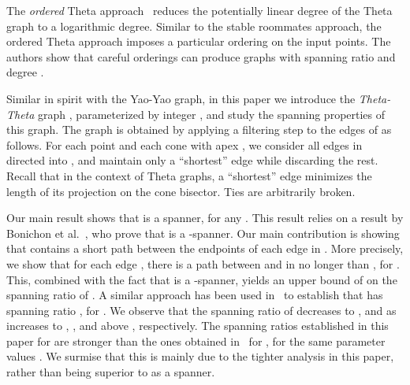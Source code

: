 \documentclass[runningheads,a4paper]{llncs}
\begin{document}
The \emph{ordered} Theta approach~\cite{BoseGM04} reduces the potentially linear degree of the Theta graph to a logarithmic degree.  
Similar to the stable roommates approach, the ordered Theta approach imposes a particular ordering on the input points. 
The authors show that careful orderings can produce graphs with spanning ratio  and degree . 




Similar in spirit with the Yao-Yao graph, in this paper we introduce the \emph{Theta-Theta} graph , parameterized by integer , and study the spanning properties of this graph.  The graph  is obtained by applying a filtering step to the edges of  as follows. For each point  and each cone  with apex , we consider all edges in  directed into , and maintain only a ``shortest'' edge while discarding the rest. Recall that in the context of Theta graphs, a ``shortest'' edge minimizes the length of its projection on the cone bisector.  Ties are arbitrarily broken.

Our main result shows that  is a spanner, for any . This result relies on a result by Bonichon et al.~\cite{BGH+10}, who prove that  is a -spanner. Our main contribution is showing that   contains a short path between the endpoints of each edge in . More precisely, we show that for each edge , there is a path between  and  in  no longer than , for . This, combined with the fact that  is a -spanner, yields an upper bound of  on the spanning ratio of . 
A similar approach has been used in~\cite{DB13} to establish that  has spanning ratio , for .  
We observe that the spanning ratio of  decreases to ,  and  as  increases to , , and above , respectively. 
The spanning ratios established in this paper for  are stronger than the ones obtained in~\cite{DB13} for , for the same parameter values . We surmise that this is mainly due to the tighter analysis in this paper, rather than  being superior to  as a spanner.
\end{document}
